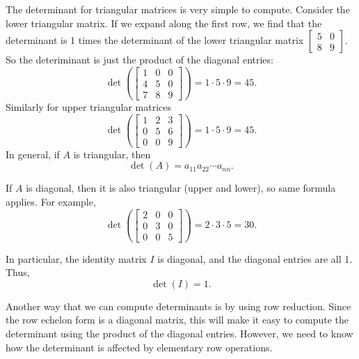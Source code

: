 The determinant for triangular matrices is very simple to compute.  
Consider the lower triangular matrix.  If we expand along the
first row, we find that the determinant is 1 times the determinant
of the lower triangular matrix $\left[ \begin{smallmatrix} 5 & 0 \\ 8 & 9
\end{smallmatrix} \right]$.  So the deteriminant is just the
product of the diagonal entries:
\begin{equation*}
\det \left(
\begin{bmatrix}
1 & 0 & 0 \\
4 & 5 & 0 \\
7 & 8 & 9
\end{bmatrix} 
\right)
=
1 \cdot 5 \cdot 9 = 45 .
\end{equation*}
Similarly for upper triangular matrices
\begin{equation*}
\det \left(
\begin{bmatrix}
1 & 2 & 3 \\
0 & 5 & 6 \\
0 & 0 & 9
\end{bmatrix}
\right)
=
1 \cdot 5 \cdot 9 = 45 .
\end{equation*}
In general, if $A$ is triangular, then
\begin{equation*}
\det (A) = a_{11} a_{22} \cdots a_{nn} .
\end{equation*}

If $A$ is diagonal, then it is also triangular (upper and lower), so
same formula applies.  For example,
\begin{equation*}
\det \left(
\begin{bmatrix}
2 & 0 & 0 \\
0 & 3 & 0 \\
0 & 0 & 5
\end{bmatrix}
\right)
=
2 \cdot 3 \cdot 5 = 30 .
\end{equation*}

In particular, the identity matrix $I$ is diagonal, and the diagonal entries
are all 1.  Thus,
\begin{equation*}
\det(I) = 1 .
\end{equation*}

Another way that we can compute determinants is by using row reduction. Since the row echelon form is a diagonal matrix, this will make it easy to compute the determinant using the product of the diagonal entries. However, we need to know how the determinant is affected by elementary row operations.

